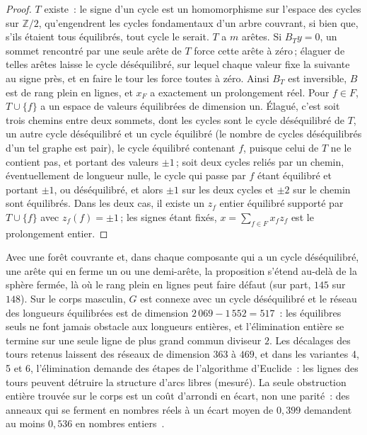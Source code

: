 \documentclass[11pt,a4paper]{article}
\newcommand{\Z}{\mathbb{Z}}
\begin{document}
\begin{proof}
$T$ existe~: le signe d'un cycle est un homomorphisme sur l'espace des cycles
sur $\Z/2$, qu'engendrent les cycles fondamentaux d'un arbre couvrant, si bien
que, s'ils étaient tous équilibrés, tout cycle le serait. $T$ a $m$ arêtes. Si
$B_T y = 0$, un sommet rencontré par une seule arête de $T$ force cette arête
à zéro\,; élaguer de telles arêtes laisse le cycle déséquilibré, sur lequel
chaque valeur fixe la suivante au signe près, et en faire le tour les force
toutes à zéro. Ainsi $B_T$ est inversible, $B$ est de rang plein en lignes,
et $x_F$ a exactement un prolongement réel. Pour $f \in F$, $T \cup \{f\}$ a
un espace de valeurs équilibrées de dimension un. Élagué, c'est soit trois
chemins entre deux sommets, dont les cycles sont le cycle déséquilibré de $T$,
un autre cycle déséquilibré et un cycle équilibré (le nombre de cycles
déséquilibrés d'un tel graphe est pair), le cycle équilibré contenant $f$,
puisque celui de $T$ ne le contient pas, et portant des valeurs $\pm1$\,; soit
deux cycles reliés par un chemin, éventuellement de longueur nulle, le cycle
qui passe par $f$ étant équilibré et portant $\pm1$, ou déséquilibré, et alors
$\pm1$ sur les deux cycles et $\pm2$ sur le chemin sont équilibrés. Dans les
deux cas, il existe un $z_f$ entier équilibré supporté par $T \cup \{f\}$ avec
$z_f(f) = \pm1$\,; les signes étant fixés, $x = \sum_{f \in F} x_f z_f$ est le
prolongement entier.
\end{proof}

Avec une forêt couvrante et, dans chaque composante qui a un cycle
déséquilibré, une arête qui en ferme un ou une demi-arête, la proposition
s'étend au-delà de la sphère fermée, là où le rang plein en lignes peut faire
défaut (sur part, $145$ sur $148$). Sur le corps masculin, $G$ est connexe
avec un cycle déséquilibré et le réseau des longueurs équilibrées est de
dimension $2\,069 - 1\,552 = 517$~: les équilibres seuls ne font jamais
obstacle aux longueurs entières, et l'élimination entière se termine sur une
seule ligne de plus grand commun diviseur $2$. Les décalages des tours retenus
laissent des réseaux de dimension $363$ à $469$, et dans les variantes 4, 5
et 6, l'élimination demande des étapes de l'algorithme d'Euclide~: les lignes
des tours peuvent détruire la structure d'arcs libres (mesuré). La seule
obstruction entière trouvée sur le corps est un coût d'arrondi en écart, non
une parité~: des anneaux qui se ferment en nombres réels à un écart moyen de
$0,399$ demandent au moins $0,536$ en nombres
entiers~\cite[\S7]{gardent2026loops}.
\end{document}
